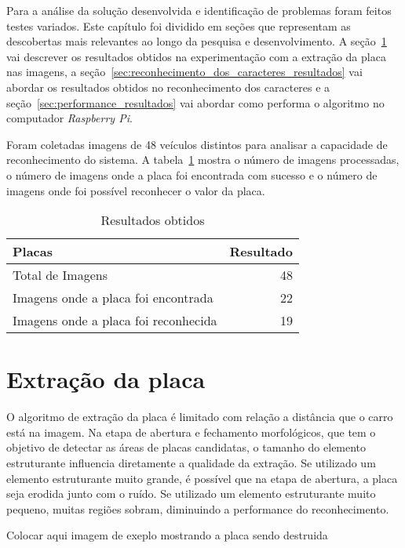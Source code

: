 Para a análise da solução desenvolvida e identificação de problemas foram feitos
testes variados. Este capítulo foi dividido em seções que representam as
descobertas mais relevantes ao longo da pesquisa e desenvolvimento. A
seção~\ref{sec:extracao_da_placa_resultados} vai descrever os resultados obtidos
na experimentação com a extração da placa nas imagens, a
seção~\ref{sec:reconhecimento_dos_caracteres_resultados} vai abordar os
resultados obtidos no reconhecimento dos caracteres e a
seção~\ref{sec:performance_resultados} vai abordar como performa o algoritmo no
computador \emph{Raspberry Pi}.

Foram coletadas imagens de 48 veículos distintos para analisar a capacidade de
reconhecimento do sistema. A tabela~\ref{tab:resultados} mostra o número de
imagens processadas, o número de imagens onde a placa foi encontrada com sucesso
e o número de imagens onde foi possível reconhecer o valor da placa.

\begin{table}[]
\centering
\caption{Resultados obtidos}
\label{tab:resultados}
\begin{tabular}{@{}lr@{}}
\toprule
Placas                               & \multicolumn{1}{l}{Resultado} \\ \midrule
Total de Imagens                     & 48                           \\
Imagens onde a placa foi encontrada  & 22                            \\
Imagens onde a placa foi reconhecida & 19
\end{tabular}
\end{table}

\section{Extração da placa}
\label{sec:extracao_da_placa_resultados}


O algoritmo de extração da placa é limitado com relação a distância que o carro
está na imagem. Na etapa de abertura e fechamento morfológicos, que tem o
objetivo de detectar as áreas de placas candidatas, o tamanho do elemento
estruturante influencia diretamente a qualidade da extração. Se utilizado um
elemento estruturante muito grande, é possível que na etapa de abertura, a placa
seja erodida junto com o ruído. Se utilizado um elemento estruturante muito
pequeno, muitas regiões sobram, diminuindo a performance do reconhecimento.

Colocar aqui imagem de exeplo mostrando a placa sendo destruida

